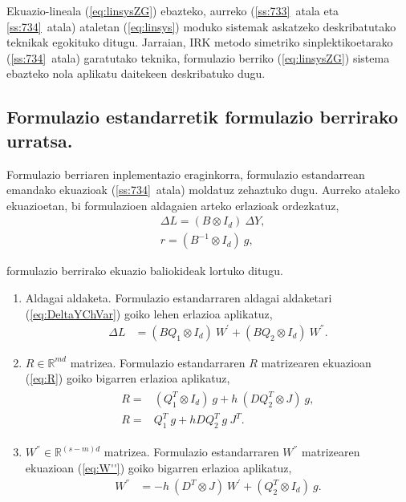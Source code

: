 Ekuazio-lineala (\ref{eq:linsysZG}) ebazteko, aurreko (\ref{ss:733}~atala eta \ref{ss:734}~atala) ataletan (\ref{eq:linsys}) moduko sistemak askatzeko deskribatutako teknikak egokituko ditugu. Jarraian, IRK metodo simetriko sinplektikoetarako (\ref{ss:734}~atala) garatutako teknika, formulazio berriko (\ref{eq:linsysZG}) sistema ebazteko nola aplikatu daitekeen deskribatuko dugu.

\subsection*{Formulazio estandarretik formulazio berrirako urratsa.}

Formulazio berriaren inplementazio eraginkorra, formulazio estandarrean emandako ekuazioak (\ref{ss:734}~atala) moldatuz zehaztuko dugu.
Aurreko ataleko ekuazioetan, bi formulazioen aldagaien arteko erlazioak ordezkatuz,
\begin{align}
\label{eq:er1}
&\Delta L =(B \otimes I_d) \ \Delta Y,\\
\label{eq:er2}
&r=(B^{-1} \otimes I_d) \ g,
\end{align}

formulazio berrirako  ekuazio baliokideak lortuko ditugu.
\begin{enumerate}

\item Aldagai aldaketa.
Formulazio estandarraren aldagai aldaketari (\ref{eq:DeltaYChVar}) goiko lehen erlazioa aplikatuz,
\begin{align}
\Delta L &=(B Q_1 \otimes I_d) \ W^{'}+(B Q_2 \otimes I_d) \ W^{''}.
\end{align}

\item $R\in \mathbb{R}^{md}$ matrizea.
Formulazio estandarraren $R$ matrizearen ekuazioan (\ref{eq:R}) goiko bigarren erlazioa aplikatuz,
\begin{align}
\begin{split}
R=&(Q_1^T \otimes I_d) \ g + h \ (D Q_2^T \otimes J) \ g,  \\
R=& Q_1^T \ g  + h D Q_2^T \ g \ J^T.
\end{split}
\end{align}

\item $W^{''}\in \mathbb{R}^{(s-m)d}$ matrizea.
Formulazio estandarraren $W^{''}$ matrizearen ekuazioan (\ref{eq:W''}) goiko bigarren erlazioa aplikatuz,
\begin{align}
W^{''}&= -h \ (D^T \otimes J) \ W^{'}+ (Q_2^T \otimes I_d) \ g.
\end{align}


\end{enumerate}


